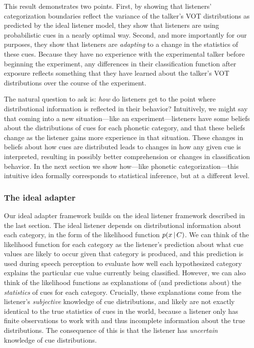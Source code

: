 This result demonstrates two points.  First, by showing that listeners' categorization boundaries reflect the variance of the talker's VOT distributions as predicted by the ideal listener model, they show that listeners are using probabilistic cues in a nearly optimal way.  Second, and more importantly for our purposes, they show that listeners are \emph{adapting} to a change in the statistics of these cues.  Because they have no experience with the experimental talker before beginning the experiment, any differences in their classification function after exposure reflects something that they have learned about the talker's VOT distributions over the course of the experiment.

The natural question to ask is: \emph{how} do listeners get to the point where distributional information is reflected in their behavior?  Intuitively, we might say that coming into a new situation---like an experiment---listeners have some beliefs about the distributions of cues for each phonetic category, and that these beliefs change as the listener gains more experience in that situation.  These changes in beliefs about how cues are distributed leads to changes in how any given cue is interpreted, resulting in possibly better comprehension or changes in classification behavior.  In the next section we show how---like phonetic categorization---this intuitive idea formally corresponds to statistical inference, but at a different level.

\subsubsection{The ideal adapter}
\label{sec:ideal-adapter}

Our ideal adapter framework builds on the ideal listener framework described in the last section.  The ideal listener depends on distributional information about each category, in the form of the likelihood function $p(x \,|\, C)$.
We can think of the likelihood function for each category as the listener's prediction about what cue values are likely to occur given that category is produced, and this prediction is used during speech perception to evaluate how well each hypothesized category explains the particular cue value currently being classified.  However, we can also think of the likelihood functions as explanations of (and predictions about) the \emph{statistics} of cues for each category.  Crucially, these explanations come from the listener's \emph{subjective} knowledge of cue distributions, and likely are not exactly identical to the true statistics of cues in the world, because a listener only has finite observations to work with and thus incomplete information about the true distributions.  The consequence of this is that the listener has \emph{uncertain} knowledge of cue distributions.

